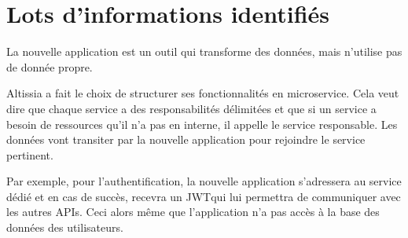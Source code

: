 \section{Lots d'informations identifiés}
\label{sec:identified-information-packages}
La nouvelle application est un outil qui transforme des données, mais n'utilise pas de donnée propre.

Altissia a fait le choix de structurer ses fonctionnalités en microservice.
Cela veut dire que chaque service a des responsabilités délimitées et que si un service a besoin de ressources qu'il n'a pas en interne, il appelle le service responsable.
Les données vont transiter par la nouvelle application pour rejoindre le service pertinent.

Par exemple, pour l'authentification, la nouvelle application s'adressera au service dédié et en cas de succès, recevra un JWT\fnmark qui lui permettra de communiquer avec les autres APIs.
Ceci alors même que l'application n'a pas accès à la base des données des utilisateurs.
